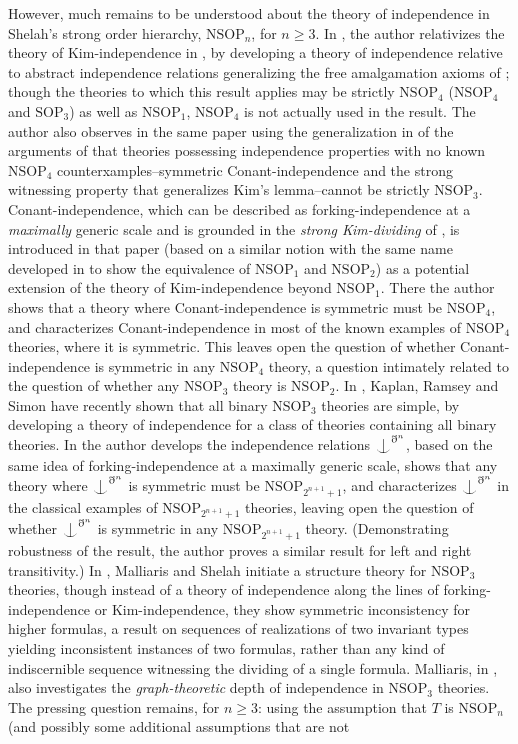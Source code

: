 \documentclass[12pt]{amsart}
\theoremstyle{definition}
\def\Ind#1#2{#1\setbox0=\hbox{$#1x$}\kern\wd0\hbox to 0pt{\hss$#1\mid$\hss}
\lower.9\ht0\hbox to 0pt{\hss$#1\smile$\hss}\kern\wd0}
\def\ind{\mathop{\mathpalette\Ind{}}}
\begin{document}
However, much remains to be understood about the theory of independence in Shelah's strong order hierarchy, $\mathrm{NSOP}_n$, for $n \geq 3$. In \cite{GFA}, the author relativizes the theory of Kim-independence in \cite{CR15}, \cite{KR17} by developing a theory of independence relative to abstract independence relations generalizing the free amalgamation axioms of \cite{Co15}; though the theories to which this result applies may be strictly $\mathrm{NSOP}_4$ ($\mathrm{NSOP}_4$ and $\mathrm{SOP}_3$) as well as $\mathrm{NSOP}_1$, $\mathrm{NSOP}_4$ is not actually used in the result. The author also observes in the same paper using the generalization in \cite{NSOP2} of the arguments of \cite{Co15} that theories possessing independence properties with no known $\mathrm{NSOP}_{4}$ counterxamples--symmetric Conant-independence and the strong witnessing property that generalizes Kim's lemma--cannot be strictly $\mathrm{NSOP}_{3}$. Conant-independence, which can be described as forking-independence at a \textit{maximally} generic scale and is grounded in the \textit{strong Kim-dividing} of \cite{KRS19}, is introduced in that paper (based on a similar notion with the same name developed in \cite{NSOP2} to show the equivalence of $\mathrm{NSOP}_1$ and $\mathrm{NSOP}_2$) as a potential extension of the theory of Kim-independence beyond $\mathrm{NSOP}_1$. There the author shows that a theory where Conant-independence is symmetric must be $\mathrm{NSOP}_4$, and characterizes Conant-independence in most of the known examples of $\mathrm{NSOP}_4$ theories, where it is symmetric. This leaves open the question of whether Conant-independence is symmetric in any $\mathrm{NSOP}_4$ theory, a question intimately related to the question of whether any $\mathrm{NSOP}_3$ theory is $\mathrm{NSOP}_2$. In \cite{CKR23}, Kaplan, Ramsey and Simon have recently shown that all binary $\mathrm{NSOP}_{3}$ theories are simple, by developing a theory of independence for a class of theories containing all binary theories. In \cite{SOPEXP} the author develops the independence relations $\ind^{\eth^n}$, based on the same idea of forking-independence at a maximally generic scale, shows that any theory where $\ind^{\eth^n}$ is symmetric must be $\mathrm{NSOP}_{2^{n+1}+1}$, and characterizes $\ind^{\eth^n}$ in the classical examples of  $\mathrm{NSOP}_{2^{n+1}+1}$ theories, leaving open the question of whether $\ind^{\eth^n}$ is symmetric in any $\mathrm{NSOP}_{2^{n+1}+1}$ theory. (Demonstrating robustness of the result, the author proves a similar result for left and right transitivity.) In \cite{MS17}, Malliaris and Shelah initiate a structure theory for $\mathrm{NSOP}_3$ theories, though instead of a theory of independence along the lines of forking-independence or Kim-independence, they show symmetric inconsistency for higher formulas, a result on sequences of realizations of two invariant types yielding inconsistent instances of two formulas, rather than any kind of indiscernible sequence witnessing the dividing of a single formula. Malliaris, in \cite{Mal10b}, also investigates the \textit{graph-theoretic} depth of independence in $\mathrm{NSOP}_{3}$ theories. The pressing question remains, for $n \geq 3$: using the assumption that $T$ is $\mathrm{NSOP}_n$ (and possibly some additional assumptions that are not 
\end{document}
